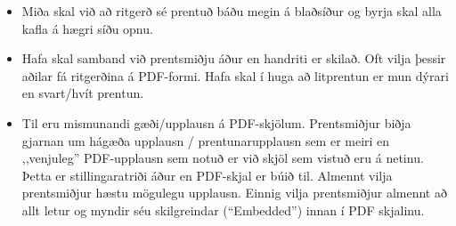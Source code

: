 \documentclass[a4paper, 12pt, twoside]{scrreprt}
\begin{document}
\begin{itemize}
 \item Miða skal við að ritgerð sé prentuð báðu megin á blaðsíður og byrja skal alla kafla á hægri síðu opnu.
 \item Hafa skal samband við prentsmiðju áður en handriti er skilað. Oft vilja þessir aðilar fá ritgerðina á PDF-formi. Hafa skal í huga að litprentun er mun dýrari en svart/hvít prentun. 
 \item Til eru mismunandi gæði/upplausn á PDF-skjölum. Prentsmiðjur biðja gjarnan um hágæða upplausn / prentunarupplausn sem er meiri en ,,venjuleg” PDF-upplausn sem notuð er við skjöl sem vistuð eru á netinu. Þetta er stillingaratriði áður en PDF-skjal er búið til. Almennt vilja prentsmiðjur hæstu mögulegu upplausn. Einnig vilja prentsmiðjur almennt að allt letur og myndir séu skilgreindar (“Embedded”) innan í PDF skjalinu.
\end{itemize}
\end{document}
